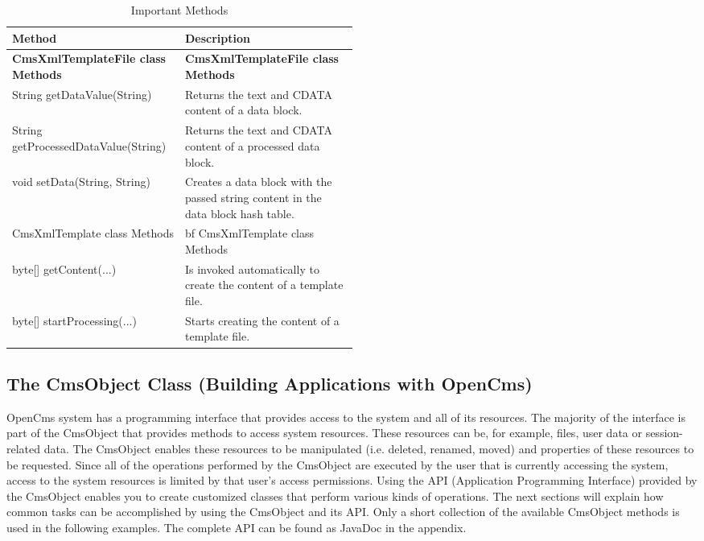 \begin{center}
\begin{table}
\begin{tabular}{|l|p{0.50\linewidth}|}
\hline
{\bf Method}&
{\bf Description}\\ \hline
{\bf CmsXmlTemplateFile class Methods} &
{\bf CmsXmlTemplateFile class Methods}\\ \hline
String getDataValue(String)&
Returns the text and CDATA content of a data block. \\ \hline
String getProcessedDataValue(String)&
Returns the text and CDATA content of a processed data block. \\ \hline 
void setData(String, String)&
Creates a data block with the passed string content in the data block hash table. \\ \hline
CmsXmlTemplate class Methods &
{bf CmsXmlTemplate class Methods} \\ \hline
byte[] getContent(...)&
Is invoked automatically to create the content of a template file. \\ \hline
byte[] startProcessing(...)&
Starts creating the content of a template file.\\ \hline
\end{tabular}
\caption[Important Methods]{Important Methods}
\label{MostImport} 
\end{table}
\end{center}

\subsection{The CmsObject Class  (Building Applications with OpenCms)}
OpenCms system has a programming interface that provides access to the
system and all of its resources. The majority of the interface is part
of the CmsObject that provides methods to access system resources.
These resources can be, for example, files, user data or session-related
data. The CmsObject enables these resources to be manipulated (i.e.
deleted, renamed, moved) and properties of these resources to be
requested. Since all of the operations performed by the {\name CmsObject} are
executed by the user that is currently accessing the system, access to
the system resources is limited by that user's access permissions.
Using the API (Application Programming Interface) provided by the
{\name CmsObject} enables you to create customized classes that perform various
kinds of operations.
The next sections will explain how common tasks can be accomplished by
using the {\name CmsObject} and its API. Only a short collection of the
available {\name CmsObject} methods is used in the following examples. The
complete API can be found as JavaDoc in the appendix.

